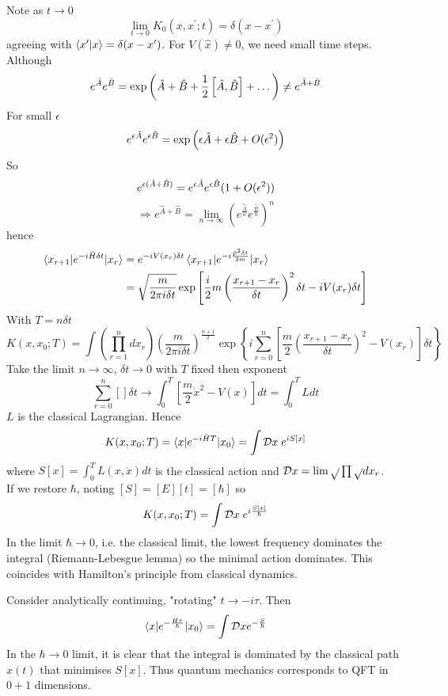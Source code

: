 \documentclass{article}
\begin{document}
Note as $t\to 0$ 
\[
\lim_{t\to 0 }  K_0(x,x^\prime;t) = \delta(x-x^\prime)
\]
agreeing with $\braket{x^\prime|x} = \delta(x-x^\prime)$. For $V(\hat{x}) \neq 0$, we need small time steps. Although 
\[
e^{\hat{A}}e^{\hat{B}} = \exp\left( \hat{A} +\hat{B} + \frac{1}{2}\comm[\hat{A}]{\hat{B}} + \dots \right) \neq e^{\hat{A} + \hat{B}}
\]
For small $\eps$
\[
e^{\eps\hat{A}}e^{\eps\hat{B}} = \exp\left( \eps\hat{A} +\eps\hat{B} + O(\eps^2) \right)
\]
So 
\[
e^{\eps(\hat{A} + \hat{B} ) } = e^{\eps\hat{A}}e^{\eps\hat{B}} ( 1 + O(\eps^2) ) 
\]
\[
\Rightarrow e^{\hat{A} + \hat{B} } = \lim_{n\to\infty} \left( e^{\frac{\hat{A}}{n}} e^{\frac{\hat{B}}{n}} \right)^n
\]
hence
\begin{align*}
\braket{x_{r+1} | e^{-i \hat{H} \delta t } | x_r } &= e^{-i V(x_r) \delta t} \braket{x_{r+1} | e^{-i \frac{\hat{p}^2 \delta t}{2m}} | x_r } \\
&= \sqrt{\frac{m}{2\pi i \delta t}} \exp \left[ \frac{i}{2} m \left( \frac{x_{r+1} - x_r}{\delta t } \right)^2 \delta t - i V(x_r) \delta t \right ]
\end{align*} 
With $T=n\delta t$
\[
K(x,x_0;T) = \int \left( \prod_{r=1}^n dx_r \right) \left( \frac{m}{2\pi i \delta t} \right)^{\frac{n+1}{2}} \exp \left\{ i \sum_{r=0}^n \left[ \frac{m}{2} \left( \frac{x_{r+1} - x_r}{\delta t } \right)^2 - V(x_r) \right] \delta t \right\} 
\]
Take the limit $n\to\infty$, $\delta t \to 0$ with $T$ fixed then exponent 
\[
\sum_{r=0}^n \left[ \right] \delta t \to \int_0^T \left[ \frac{m}{2} \dot{x}^2 - V(x) \right] dt = \int_0^T L dt 
\]
$L$ is the classical Lagrangian. Hence 
\[
K(x,x_0;T) = \braket{x | e^{-i\hat{H} T} | x_0} = \int \mc{D}x \; e^{iS[x]}
\]
where $S[x] = \int_0^T L(x,\dot{x}) dt$ is the classical action and $\mc{D}x = \lim \sqrt{} \prod \sqrt{} dx_r$.\\
If we restore $\hbar$, noting $[S] = [E][t] = [\hbar]$ so 
\[
K(x,x_0;T)  = \int \mc{D}x \; e^{i\frac{S[x]}{\hbar}}
\]
In the limit $\hbar \to 0$, i.e. the classical limit, the lowest frequency dominates the integral (Riemann-Lebesgue lemma) so the minimal action dominates. This coincides with Hamilton's principle from classical dynamics. 

Consider analytically continuing, "rotating" $t \to -i\tau$. Then 
\[
\braket{x | e^{-\frac{H\tau}{\hbar}} | x_0 } = \int \mc{D}x e^{-\frac{S}{\hbar}}
\]
In the $\hbar \to 0$ limit, it is clear that the integral is dominated by the classical path $x(t)$ that minimises $S[x]$. Thus quantum mechanics corresponds to QFT in $0+1$ dimensions. 
\end{document}
